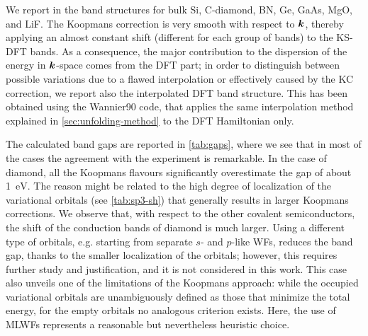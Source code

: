 We report in  the band structures for bulk Si, C-diamond, BN, Ge, GaAs, MgO, and LiF. The Koopmans correction is very smooth with respect to ${\bm k}$, thereby applying an almost constant shift (different for each group of bands) to the KS-DFT bands. As a consequence, the major contribution to the dispersion of the energy in ${\bm k}$-space comes from the DFT part; in order to distinguish between possible variations due to a flawed interpolation or effectively caused by the KC correction, we report also the interpolated DFT band structure. This has been obtained using the Wannier90 code, that applies the same interpolation method explained in \cref{sec:unfolding-method} to the DFT Hamiltonian only.

The calculated band gaps are reported in \cref{tab:gaps}, where we see that in most of the cases the agreement with the experiment is remarkable. In the case of diamond, all the Koopmans flavours significantly overestimate the gap of about 1~$\si{\electronvolt}$. The reason might be related to the high degree of localization of the variational orbitals (see \cref{tab:sp3-sh}) that generally results in larger Koopmans corrections. We observe that, with respect to the other covalent semiconductors, the shift of the conduction bands of diamond is much larger. Using a different type of orbitals, e.g. starting from separate $s$- and $p$-like WFs, reduces the band gap, thanks to the smaller localization of the orbitals; however, this requires further study and justification, and it is not considered in this work. This case also unveils one of the limitations of the Koopmans approach: while the occupied variational orbitals are unambiguously defined as those that minimize the total energy, for the empty orbitals no analogous criterion exists. Here, the use of MLWFs represents a reasonable but nevertheless heuristic choice.

